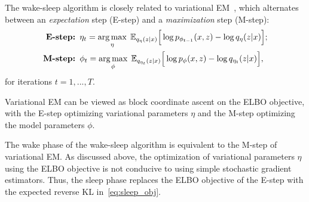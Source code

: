 The wake-sleep algorithm is closely related to variational EM~\citep{Jordan_intro_vi, neal2000varem, Beal2002varem}, 
which alternates between an {\itshape expectation} step (E-step) and a {\itshape maximization} step (M-step): 
\begin{align}
    \text{{\bf E-step: }} & 
    \eta_{t} = \operatorname*{arg\,max}_{\eta}\; \mathbb{E}_{q_\eta(z | x)}\Big[\log p_{\phi_{t-1}}(x, z) - \log q_\eta(z | x)\Big]; 
    \label{eq:e_step}
    \\
    \text{{\bf M-step: }} & \phi_{t} = \operatorname*{arg\,max}_{\phi}\; \mathbb{E}_{q_{\eta_t}(z | x)}\Big[\log p_{\phi}(x, z) - \log q_{\eta_t}(z | x)\Big],
    \label{eq:m_step}
\end{align}
for iterations $t = 1, ..., T$. 

Variational EM can be viewed as block coordinate ascent on the ELBO objective, with the E-step optimizing variational parameters $\eta$ and the M-step optimizing the model parameters $\phi$. 

The wake phase of the wake-sleep algorithm is equivalent to the M-step of variational EM. 
As discussed above, the optimization of variational parameters $\eta$ using the ELBO objective is not conducive to using simple stochastic gradient estimators.
Thus, the sleep phase replaces the ELBO objective of the E-step with the expected reverse KL in~\eqref{eq:sleep_obj}.